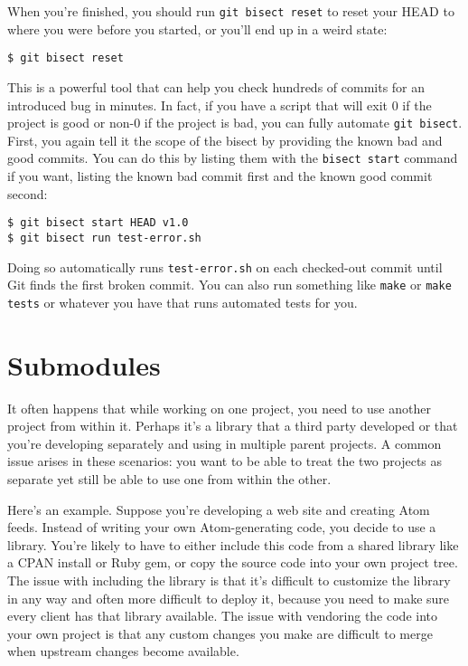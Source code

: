 \documentclass[a4paper]{book}
\begin{document}
When you're finished, you should run \texttt{git bisect reset} to reset your HEAD to where you were before you started, or you'll end up in a weird state:

\begin{shaded}\begin{verbatim}
$ git bisect reset
\end{verbatim}\end{shaded}

This is a powerful tool that can help you check hundreds of commits for an introduced bug in minutes. In fact, if you have a script that will exit 0 if the project is good or non-0 if the project is bad, you can fully automate \texttt{git bisect}. First, you again tell it the scope of the bisect by providing the known bad and good commits. You can do this by listing them with the \texttt{bisect start} command if you want, listing the known bad commit first and the known good commit second:

\begin{shaded}\begin{verbatim}
$ git bisect start HEAD v1.0
$ git bisect run test-error.sh
\end{verbatim}\end{shaded}

Doing so automatically runs \texttt{test-error.sh} on each checked-out commit until Git finds the first broken commit. You can also run something like \texttt{make} or \texttt{make tests} or whatever you have that runs automated tests for you.

\section{Submodules}\label{submodules}

It often happens that while working on one project, you need to use another project from within it. Perhaps it's a library that a third party developed or that you're developing separately and using in multiple parent projects. A common issue arises in these scenarios: you want to be able to treat the two projects as separate yet still be able to use one from within the other.

Here's an example. Suppose you're developing a web site and creating Atom feeds. Instead of writing your own Atom-generating code, you decide to use a library. You're likely to have to either include this code from a shared library like a CPAN install or Ruby gem, or copy the source code into your own project tree. The issue with including the library is that it's difficult to customize the library in any way and often more difficult to deploy it, because you need to make sure every client has that library available. The issue with vendoring the code into your own project is that any custom changes you make are difficult to merge when upstream changes become available.
\end{document}
